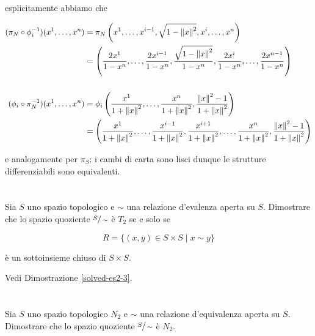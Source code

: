 esplicitamente abbiamo che

\begin{align}
	\begin{split}
		(\pi_{N} \circ \phi_{i}^{-1})(x^{1},\dots,x^{n}) &= \pi_{N} \left( x^{1}, \dots, x^{i-1}, \sqrt{1 - \norm{x}^{2}}, x^{i}, \dots, x^{n} \right)\\
		&= \left( \dfrac{2 x^{1}}{1-x^{n}}, \dots, \dfrac{2 x^{i-1}}{1-x^{n}}, \dfrac{\sqrt{1 - \norm{x}^{2}}}{1-x^{n}}, \dfrac{2 x^{i}}{1-x^{n}}, \dots, \dfrac{2 x^{n-1}}{1-x^{n}} \right)\\\\
		(\phi_{i} \circ \pi_{N}^{-1})(x^{1},\dots,x^{n}) &= \phi_{i} \left( \dfrac{x^{1}}{1 + \norm{x}^{2}}, \dots, \dfrac{x^{n}}{1 + \norm{x}^{2}}, \dfrac{\norm{x}^{2} - 1}{1 + \norm{x}^{2}} \right)\\
		&= \left( \dfrac{x^{1}}{1 + \norm{x}^{2}}, \dots, \dfrac{x^{i-1}}{1 + \norm{x}^{2}}, \dfrac{x^{i+1}}{1 + \norm{x}^{2}}, \dots, \dfrac{x^{n}}{1 + \norm{x}^{2}}, \dfrac{\norm{x}^{2} - 1}{1 + \norm{x}^{2}} \right)
	\end{split}
\end{align}

e analogamente per $ \pi_{S} $: i cambi di carta sono lisci dunque le strutture differenziabili sono equivalenti.

\tocless\section{}\label{es2-3}

\begin{tcolorbox}
	Sia $ S $ uno spazio topologico e $ \sim $ una relazione d'evalenza aperta su $ S $. Dimostrare che lo spazio quoziente $ \sfrac{S}{\sim} $ è $ T_{2} $ se e solo se
	
	\begin{equation}
		R = \{ (x,y) \in S \times S \mid x \sim y \}
	\end{equation}
	
	è un sottoinsieme chiuso di $ S \times S $.
\end{tcolorbox}

Vedi Dimostrazione \ref{solved-es2-3}.

\tocless\section{}\label{es2-4}

\begin{tcolorbox}
	Sia $ S $ uno spazio topologico $ N_{2} $ e $ \sim $ una relazione d'equivalenza aperta su $ S $. Dimostrare che lo spazio quoziente $ \sfrac{S}{\sim} $ è $ N_{2} $.
\end{tcolorbox}

